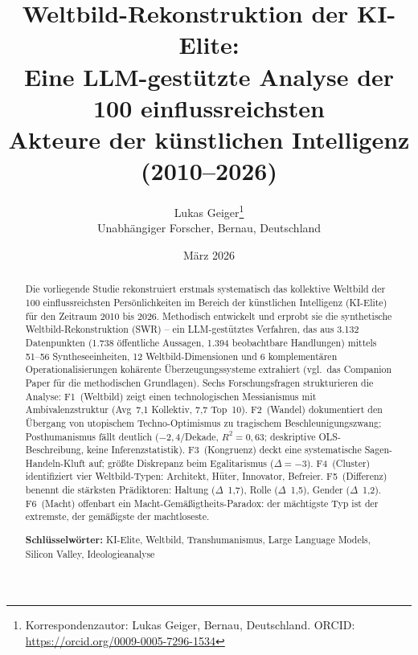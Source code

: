 \documentclass[12pt,a4paper]{article}
\title{%
  \sffamily\bfseries
  Weltbild-Rekonstruktion der KI-Elite:\\[0.3em]
  \large Eine LLM-gest\"utzte Analyse der 100 einflussreichsten\\
  Akteure der k\"unstlichen Intelligenz (2010--2026)%
}
\author{%
  Lukas Geiger\thanks{Korrespondenzautor: Lukas Geiger, Bernau, Deutschland. ORCID: \url{https://orcid.org/0009-0005-7296-1534}}\\[0.3em]
  \small Unabh\"angiger Forscher, Bernau, Deutschland
}
\date{M\"arz 2026}
\begin{document}


\maketitle
\thispagestyle{empty}

\begin{abstract}
\noindent
Die vorliegende Studie rekonstruiert erstmals systematisch das kollektive Weltbild der 100 einflussreichsten Pers\"onlichkeiten im Bereich der k\"unstlichen Intelligenz (KI-Elite) f\"ur den Zeitraum 2010 bis 2026. Methodisch entwickelt und erprobt sie die synthetische Weltbild-Rekonstruktion (SWR) -- ein LLM-gest\"utztes Verfahren, das aus 3.132 Datenpunkten (1.738 \"offentliche Aussagen, 1.394 beobachtbare Handlungen) mittels 51--56 Syntheseeinheiten, 12 Weltbild-Dimensionen und 6 komplement\"aren Operationalisierungen koh\"arente \"Uberzeugungssysteme extrahiert (vgl.\ das Companion Paper \citealt{Geiger2026SWR} f\"ur die methodischen Grundlagen). Sechs Forschungsfragen strukturieren die Analyse: F1~(Weltbild) zeigt einen \glqq technologischen Messianismus mit Ambivalenzstruktur\grqq{} (Avg~7,1 Kollektiv, 7,7 Top~10). F2~(Wandel) dokumentiert den \"Ubergang von utopischem Techno-Optimismus zu tragischem Beschleunigungszwang; Posthumanismus f\"allt deutlich ($-2{,}4$/Dekade, $R^2 = 0{,}63$; deskriptive OLS-Beschreibung, keine Inferenzstatistik). F3~(Kongruenz) deckt eine systematische Sagen-Handeln-Kluft auf; gr\"o\ss{}te Diskrepanz beim Egalitarismus ($\Delta = -3$). F4~(Cluster) identifiziert vier Weltbild-Typen: Architekt, H\"uter, Innovator, Befreier. F5~(Differenz) benennt die st\"arksten Pr\"adiktoren: Haltung ($\Delta$~1,7), Rolle ($\Delta$~1,5), Gender ($\Delta$~1,2). F6~(Macht) offenbart ein Macht-Gem\"a\ss{}igtheits-Paradox: der m\"achtigste Typ ist der extremste, der gem\"a\ss{}igste der machtloseste.

\medskip
\noindent\textbf{Schl\"usselw\"orter:} KI-Elite, Weltbild, Transhumanismus, Large Language Models, Silicon Valley, Ideologieanalyse
\end{abstract}

\newpage
\setcounter{page}{1}

\end{document}
